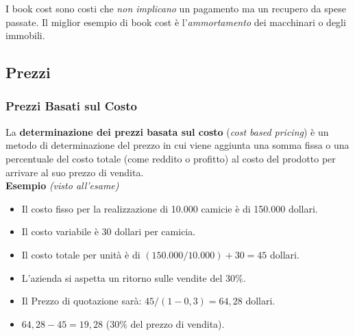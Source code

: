 \documentclass[a4paper,portrait,12pt]{article}
\theoremstyle{definition}
\begin{document}
I book cost sono costi che \emph{non implicano} un pagamento ma un recupero da spese passate.
Il miglior esempio di book cost è l'\emph{ammortamento} dei macchinari o degli immobili.


\subsection{Prezzi}

\subsubsection{Prezzi Basati sul Costo}
La \textbf{determinazione dei prezzi basata sul costo} (\emph{cost based pricing}) è un metodo di determinazione del prezzo in cui viene aggiunta una somma fissa o una percentuale del costo totale (come reddito o profitto) al costo del prodotto per arrivare al suo prezzo di vendita.\\

\textbf{Esempio} \emph{(visto all'esame)}
\begin{itemize}
\item Il costo fisso per la realizzazione di 10.000 camicie è di 150.000 dollari.
\item Il costo variabile è 30 dollari per camicia.
\item Il costo totale per unità è di $(150.000 / 10.000) + 30 = 45$ dollari.
\item L'azienda si aspetta un ritorno sulle vendite del 30\%.
\item Il Prezzo di quotazione sarà: $45 / (1 - 0,3) = 64,28$ dollari.
\item $64,28 - 45 = 19,28$ (30\% del prezzo di vendita).
\end{itemize}
\end{document}
